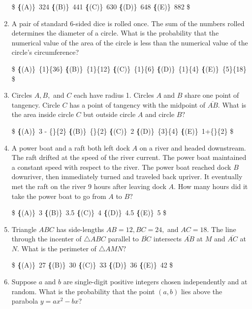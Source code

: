 \documentclass{article}
\begin{document}
\begin{enumerate}[label=\arabic*., itemsep=0.5em]
\$
\textbf\{(A)\}\ 324 \qquad
\textbf\{(B)\}\ 441 \qquad
\textbf\{(C)\}\ 630 \qquad
\textbf\{(D)\}\ 648 \qquad
\textbf\{(E)\}\ 882 \$\par \vspace{0.5em}\item A pair of standard $6$-sided dice is rolled once. The sum of the numbers rolled determines the diameter of a circle. What is the probability that the numerical value of the area of the circle is less than the numerical value of the circle's circumference?

\$
\textbf\{(A)\}\ \frac\{1\}\{36\} \qquad
\textbf\{(B)\}\ \frac\{1\}\{12\} \qquad
\textbf\{(C)\}\ \frac\{1\}\{6\} \qquad
\textbf\{(D)\}\ \frac\{1\}\{4\} \qquad
\textbf\{(E)\}\ \frac\{5\}\{18\} \$\par \vspace{0.5em}\item Circles $A, B,$ and $C$ each have radius 1. Circles $A$ and $B$ share one point of tangency. Circle $C$ has a point of tangency with the midpoint of $\overline{AB}.$ What is the area inside circle $C$ but outside circle $A$ and circle $B?$

\$
\textbf\{(A)\}\ 3 - \frac\{\pi\}\{2\} \qquad
\textbf\{(B)\}\ \frac\{\pi\}\{2\} \qquad
\textbf\{(C)\}\  2 \qquad
\textbf\{(D)\}\ \frac\{3\pi\}\{4\} \qquad
\textbf\{(E)\}\ 1+\frac\{\pi\}\{2\} \$\par \vspace{0.5em}\item A power boat and a raft both left dock $A$ on a river and headed downstream. The raft drifted at the speed of the river current. The power boat maintained a constant speed with respect to the river. The power boat reached dock $B$ downriver, then immediately turned and traveled back upriver. It eventually met the raft on the river 9 hours after leaving dock $A.$ How many hours did it take the power boat to go from $A$ to $B?$

\$
\textbf\{(A)\}\ 3 \qquad
\textbf\{(B)\}\ 3.5 \qquad
\textbf\{(C)\}\  4 \qquad
\textbf\{(D)\}\ 4.5 \qquad
\textbf\{(E)\}\ 5 \$\par \vspace{0.5em}\item Triangle $ABC$ has side-lengths $AB = 12, BC = 24,$ and $AC = 18.$ The line through the incenter of $\triangle ABC$ parallel to $\overline{BC}$ intersects $\overline{AB}$ at $M$ and $\overline{AC}$ at $N.$ What is the perimeter of $\triangle AMN?$

\$
\textbf\{(A)\}\ 27 \qquad
\textbf\{(B)\}\ 30 \qquad
\textbf\{(C)\}\  33 \qquad
\textbf\{(D)\}\ 36 \qquad
\textbf\{(E)\}\ 42 \$\par \vspace{0.5em}\item Suppose $a$ and $b$ are single-digit positive integers chosen independently and at random. What is the probability that the point $(a,b)$ lies above the parabola $y=ax^2-bx$?


\end{enumerate}
\end{document}
